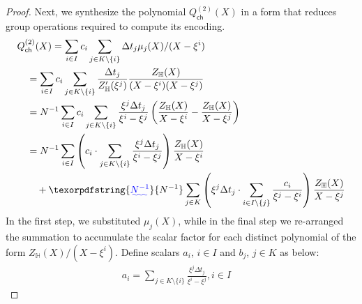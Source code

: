 \documentclass[sigconf]{acmart}
\newcommand{\setind}{I}
\newcommand{\Qcachepolytwo}[1]{Q^{(2)}_{\mathsf{ch}}({#1})} %
\newcommand{\vpolyN}{Z_\mathbb{H}}
\newcommand{\nroots}{\mathbb{H}}
\newcommand{\elttwo}[1]{[#1]_2}
\newtheorem{fact}{Fact}[section]
\providecommand{\DIFaddtex}[1]{{\protect\color{blue}\uwave{#1}}} %
\providecommand{\DIFaddbegin}{} %
\providecommand{\DIFaddend}{} %
\providecommand{\DIFdelbegin}{} %
\providecommand{\DIFdelend}{} %
\providecommand{\DIFadd}[1]{\texorpdfstring{\DIFaddtex{#1}}{#1}} %
\newcommand{\DIFscaledelfig}{0.5}
\newlength{\DIFdelgraphicswidth} %
\newlength{\DIFdelgraphicsheight} %
\newcommand{\DIFaddincludegraphics}[2][]{{\color{blue}\fbox{\DIFOincludegraphics[#1]{#2}}}} %
\newcommand{\DIFdelincludegraphics}[2][]{%
	\sbox{\DIFdelgraphicsbox}{\DIFOincludegraphics[#1]{#2}}%
	\settoboxwidth{\DIFdelgraphicswidth}{\DIFdelgraphicsbox} %
	\settoboxtotalheight{\DIFdelgraphicsheight}{\DIFdelgraphicsbox} %
	\scalebox{\DIFscaledelfig}{%
		\parbox[b]{\DIFdelgraphicswidth}{\usebox{\DIFdelgraphicsbox}\\[-\baselineskip] \rule{\DIFdelgraphicswidth}{0em}}\llap{\resizebox{\DIFdelgraphicswidth}{\DIFdelgraphicsheight}{%
				\setlength{\unitlength}{\DIFdelgraphicswidth}%
				\begin{picture}(1,1)%
					\thicklines\linethickness{2pt} %
					{\color[rgb]{1,0,0}\put(0,0){\framebox(1,1){}}}%
					{\color[rgb]{1,0,0}\put(0,0){\line( 1,1){1}}}%
					{\color[rgb]{1,0,0}\put(0,1){\line(1,-1){1}}}%
				\end{picture}%
			}\hspace*{3pt}}} %
} %
\DeclareRobustCommand{\DIFaddbegin}{\DIFOaddbegin \let\includegraphics\DIFaddincludegraphics} %
\DeclareRobustCommand{\DIFaddend}{\DIFOaddend \let\includegraphics\DIFOincludegraphics} %
\DeclareRobustCommand{\DIFdelbegin}{\DIFOdelbegin \let\includegraphics\DIFdelincludegraphics} %
\DeclareRobustCommand{\DIFdelend}{\DIFOaddend \let\includegraphics\DIFOincludegraphics} %
\begin{document}
\begin{proof}
		Next, we synthesize the polynomial $\Qcachepolytwo{X}$ in a form that reduces group operations required to compute its encoding.
		\begin{align}\label{eq:Qcachepoly2}
			&\Qcachepolytwo{X} = \sum_{i\in \setind}c_i\sum_{j\in K\setminus \{i\}} \Delta t_j\mu_j(X)/(X-\xi^i) \nonumber \\
			&\quad = \sum_{i\in\setind}c_i\sum_{j\in K\setminus \{i\}}\frac{\Delta t_j}{Z_{\nroots}'(\xi^j)} \frac{Z_{\nroots}(X)}{(X-\xi^i)(X-\xi^j)} \nonumber \\
			&\quad = N^{-1}\sum_{i\in\setind}c_i\sum_{j\in K\setminus \{i\}}\frac{\xi^j\Delta t_j}{\xi^i-\xi^j}
			\left(\frac{Z_\nroots(X)}{X-\xi^i} - \frac{Z_\nroots(X)}{X-\xi^j}\right) \nonumber \\
			&\quad = N^{-1}\sum_{i\in\setind}\left(c_i\cdot \sum_{j\in K\setminus \{i\}} \frac{\xi^j\Delta t_j}{\xi^i-\xi^j}\right)\frac{Z_\nroots(X)}{X-\xi^i} \nonumber \\
			&\qquad + \DIFaddbegin \DIFadd{N^{-1} }\DIFaddend \sum_{j\in K}\left(\xi^j\Delta t_j\cdot \sum_{i\in \setind\setminus \{j\}}\frac{c_i}{\xi^j-\xi^i}\right)\frac{Z_{\nroots}(X)}{X-\xi^j}
		\end{align}
		In the first step, we substituted $\mu_j(X)$, while in the final step we re-arranged the summation to accumulate the scalar factor for
		each distinct polynomial of the form $\vpolyN(X)/(X-\xi^i)$. Define scalars $a_i$, $i\in I$ and $b_j$, $j\in K$ as below:
		\begin{gather}\DIFdelbegin %
			\DIFdelend \DIFaddbegin \label{eq:scalars1}
			\DIFaddend a_i = \sum_{j\in K\setminus \{i\}}\frac{\xi^j\Delta t_j}{\xi^i-\xi^j}, i\in \setind\quad

\end{gather}
\end{proof}
\end{document}
